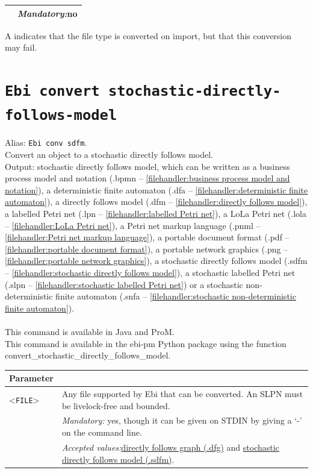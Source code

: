 {\begin{tabularx}{\linewidth}{lX}
&\textit{Mandatory:}\quad no\\
\bottomrule
\end{tabularx}
A \textdagger{} indicates that the file type is converted on import, but that this conversion may fail.
\clearpage\section{\texttt{Ebi convert stochastic-directly-follows-model}}
\label{command:Ebi convert stochastic-directly-follows-model}
Alias: \texttt{Ebi conv sdfm}.\\
Convert an object to a stochastic directly follows model.\\
\noindent Output: stochastic directly follows model, which can be written as a business process model and notation (.bpmn -- \cref{filehandler:business process model and notation}), a deterministic finite automaton (.dfa -- \cref{filehandler:deterministic finite automaton}), a directly follows model (.dfm -- \cref{filehandler:directly follows model}), a labelled Petri net (.lpn -- \cref{filehandler:labelled Petri net}), a LoLa Petri net (.lola -- \cref{filehandler:LoLa Petri net}), a Petri net markup language (.pnml -- \cref{filehandler:Petri net markup language}), a portable document format (.pdf -- \cref{filehandler:portable document format}), a portable network graphics (.png -- \cref{filehandler:portable network graphics}), a stochastic directly follows model (.sdfm -- \cref{filehandler:stochastic directly follows model}), a stochastic labelled Petri net (.slpn -- \cref{filehandler:stochastic labelled Petri net}) or a stochastic non-deterministic finite automaton (.snfa -- \cref{filehandler:stochastic non-deterministic finite automaton}).\\
\\This command is available in Java and ProM.
\\This command is available in the ebi-pm Python package using the function convert\_stochastic\_directly\_follows\_model.
\begin{tabularx}{\linewidth}{lX}
\toprule
Parameter \\\midrule
<\texttt{FILE}>&Any file supported by Ebi that can be converted. An SLPN must be livelock-free and bounded.\\
&\textit{Mandatory:} \quad yes, though it can be given on STDIN by giving a `-' on the command line.\\
&\textit{Accepted values:}\quad \hyperref[filehandler:directly follows graph]{directly follows graph (.dfg)} and \hyperref[filehandler:stochastic directly follows model]{stochastic directly follows model (.sdfm)}.\\

\end{tabularx}}
